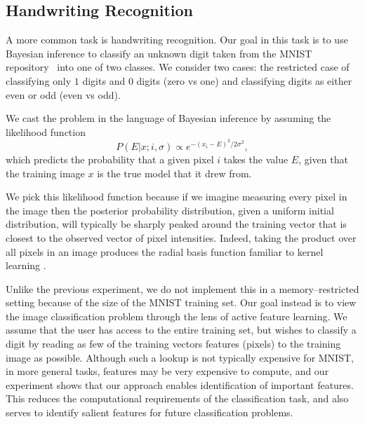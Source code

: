 \documentclass{article} %
\begin{document}
\subsection{Handwriting Recognition}

A more common task is handwriting recognition.  Our goal in this task is to use
Bayesian inference to classify an unknown digit taken from the MNIST repository~\cite{lecun1998mnist} into
one of two classes.  We consider two cases: the restricted case of classifying only $1$ digits and $0$ digits (zero vs one) and classifying digits as either even or odd (even vs odd).

We cast the problem in the language of Bayesian inference by assuming the likelihood
function
\begin{equation}
P(E|x;i,\sigma)\propto e^{-(x_i - E)^2/2\sigma^2}\label{eq:gausseq},
\end{equation}
which predicts the probability that a given pixel $i$ takes the value $E$,
given that the training image $x$ is the true model that it drew from.

We pick this likelihood function because if we imagine measuring every pixel in the image then the
posterior probability distribution, given a uniform initial distribution, will typically be sharply peaked around
the training vector that is closest to the observed vector of pixel intensities.
Indeed, taking the product over all pixels in an image produces the radial basis function
familiar to kernel learning \cite{scholkopf_learning_2001}.



Unlike the previous experiment, we do not implement this in a memory--restricted
setting because of the size of the MNIST training set.
Our goal instead is to view the image classification problem through the lens of active feature learning.  
We assume that the user has access to the entire training set, but wishes to classify a digit by reading as few of the training vectors features (pixels) to the training
image as possible.  Although such a lookup is not typically expensive for MNIST, in more general tasks, features may be very expensive to compute, and our experiment shows that our approach enables identification of important features.  This reduces the computational requirements of the classification task, and also serves to identify salient features for future 
classification problems.
\end{document}
